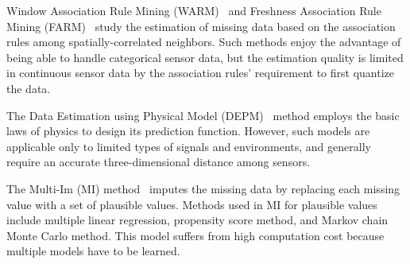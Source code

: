 Window Association Rule Mining (WARM)~\cite{le2005estimating} and Freshness Association Rule Mining (FARM)~\cite{Gruenwald:FARM} study the estimation of missing data based on the association rules among spatially-correlated neighbors. 
Such methods enjoy the advantage of being able to handle categorical sensor data, but the 
estimation quality is limited in continuous sensor data by the association rules' requirement to 
first quantize the data.

The Data Estimation using Physical Model (DEPM)~\cite{li2008data} method employs the basic laws of physics to 
design its prediction function. %
However, such models are applicable only to limited types of signals and environments, and generally require 
an accurate three-dimensional distance among sensors.

The Multi-Im (MI) method~\cite{yuan2000multiple} imputes the missing data by replacing each missing value with a set of plausible values.
Methods used in MI for plausible values include multiple linear regression, propensity score method, and 
Markov chain Monte Carlo method.
This model suffers from high computation cost because multiple models have to be learned. 

